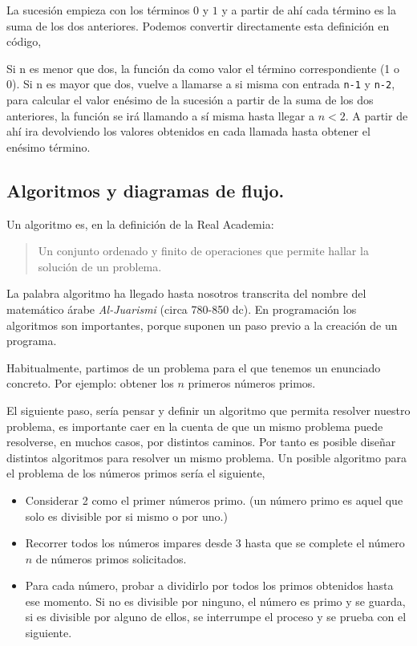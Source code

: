 La sucesión empieza con los términos $0$ y $1$ y a partir de ahí cada término es la suma de los dos anteriores. Podemos convertir directamente esta definición en código,

%

Si n es menor que dos, la función da como valor el término correspondiente (1 o 0). Si n es mayor que dos, vuelve a llamarse a si misma con entrada \texttt{n-1} y \texttt{n-2}, para calcular el valor enésimo de la sucesión a partir de la suma de los dos anteriores, la función se irá llamando a sí misma hasta  llegar a $n<2$. A partir de ahí ira devolviendo los valores obtenidos en cada llamada hasta obtener el enésimo término.

\subsection{Algoritmos y diagramas de flujo.} 
Un algoritmo es, en la definición de la Real Academia: 
\begin{quotation}
Un conjunto ordenado y finito de operaciones que permite hallar la solución de un problema.
\end{quotation}

La palabra algoritmo ha llegado hasta nosotros transcrita del nombre del matemático árabe \emph{Al-Juarismi} (circa 780-850 dc). En programación los algoritmos son importantes, porque suponen un paso previo a la creación de un programa.

Habitualmente, partimos de un problema para el que tenemos un enunciado concreto. Por ejemplo: obtener los $n$ primeros números primos. 

El siguiente paso, sería pensar y definir un algoritmo que permita resolver nuestro problema, es importante caer en la cuenta de que un mismo problema puede resolverse, en muchos casos, por distintos caminos. Por tanto es posible diseñar distintos algoritmos para resolver un mismo problema. Un posible algoritmo para el problema de los números primos sería el siguiente,

\begin{itemize}
\item Considerar 2 como el primer números primo. (un número primo es aquel que solo es divisible por si mismo o por uno.)
\item Recorrer todos los números impares desde 3 hasta que se complete el número $n$ de números primos solicitados.
\item Para cada número, probar a dividirlo por todos los primos obtenidos hasta ese momento. Si no es divisible por ninguno, el número es primo y se guarda, si es divisible por alguno de ellos, se interrumpe el proceso y se prueba con el siguiente.
\end{itemize}

